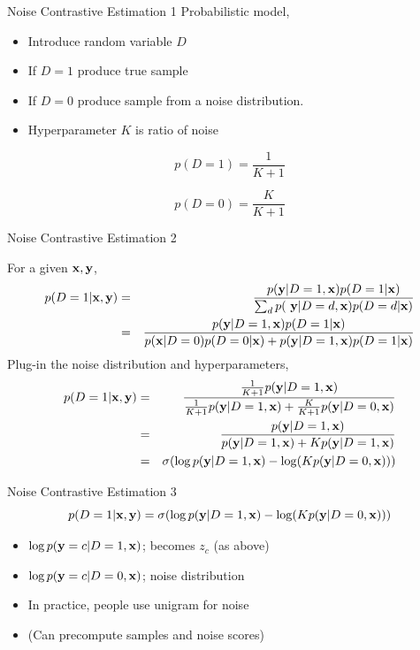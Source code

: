 \documentclass{beamer}
\begin{document}
\begin{frame}{Noise Contrastive Estimation 1}
  Probabilistic model,
  \begin{itemize}
  \item Introduce random variable $D$
  \item If $D=1$ produce true sample
  \item If $D=0$ produce sample from a noise distribution.
  \item Hyperparameter $K$ is ratio of noise
  \end{itemize}


  \[p(D=1) =   \frac{1}{K+1}\]

  \[p(D=0) = \frac{K}{K+1}\]
   
\end{frame}

\begin{frame}{Noise Contrastive Estimation 2}

  For a given $\mathbf{x}, \mathbf{y}$, 
  \begin{eqnarray*}
  p(D=1 | \mathbf{x}, \mathbf{y}) &=&  \frac{p(\mathbf{y}|D=1, \mathbf{x}) p(D=1 | \mathbf{x})}{\sum_{d} p(\ \mathbf{y}|D=d, \mathbf{x} ) p(D=d | \mathbf{x}) } \\
  &=&  \frac{p( \mathbf{y}|D=1, \mathbf{x}) p(D=1 | \mathbf{x})}{p(\mathbf{x}|D=0)p(D=0 | \mathbf{x}) +  p(\mathbf{y}|D=1,\mathbf{x})  p(D=1 | \mathbf{x}) }
  \end{eqnarray*}
  Plug-in the noise distribution and hyperparameters,
  \begin{eqnarray*}
    p(D=1 | \mathbf{x}, \mathbf{y}) &=& \frac{\frac{1}{K+1} p(\mathbf{y}|D=1, \mathbf{x})}{\frac{1}{K+1} p(\mathbf{y}|D=1, \mathbf{x}) + \frac{K}{K+1} p(\mathbf{y}|D=0, \mathbf{x}) }\\
    &=& \frac{p(\mathbf{y}|D=1, \mathbf{x})}{p(\mathbf{y}|D=1, \mathbf{x}) + K p(\mathbf{y}|D=1, \mathbf{x}) } \\
    &=& \sigma(\log p(\mathbf{y}|D=1, \mathbf{x}) - \log(K p(\mathbf{y}|D=0, \mathbf{x}))) \\  
  \end{eqnarray*}
\end{frame}

\begin{frame}{Noise Contrastive Estimation 3}
  \[p(D=1 | \mathbf{x}, \mathbf{y}) = \sigma(\log p(\mathbf{y}|D=1, \mathbf{x}) - \log(K p(\mathbf{y}|D=0, \mathbf{x})))\]

  \begin{itemize}
  \item $\log p(\mathbf{y}=c|D=1, \mathbf{x})$; becomes $z_c$ (as above)
    \air
  \item $\log p(\mathbf{y}=c|D=0, \mathbf{x})$; noise distribution 
    \air 
  \item In practice, people use unigram for noise
    \air 

  \item (Can precompute samples and noise scores)
  \end{itemize}
\end{frame}
\end{document}

